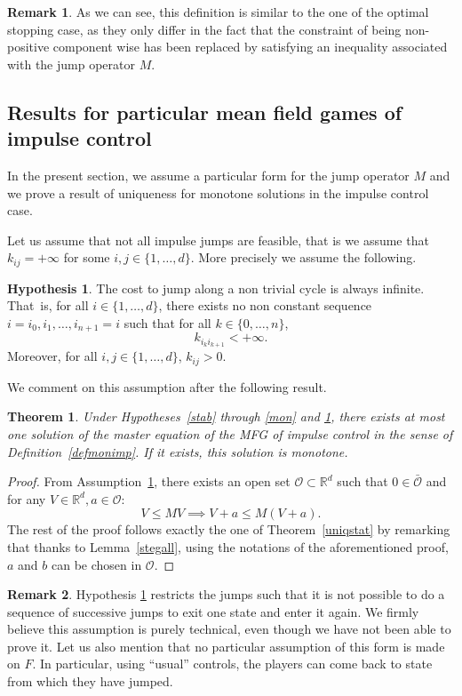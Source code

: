 \documentclass[10pt]{amsart}
\let\mathcal\mathscr
\newtheorem{Theorem}{Theorem}[section]
\theoremstyle{definition}
\newtheorem{Rem}{Remark}[section]
\newtheorem{hyp}{Hypothesis}
\begin{document}
\begin{Rem}
As we can see, this definition is similar to the one of the optimal stopping case, as they only differ in the fact that the constraint of being non-positive component wise has been replaced by satisfying an inequality associated with the jump operator $M$.
\end{Rem}
\subsection{Results for particular mean field games of impulse control}
In the present section, we 	assume a particular form for the jump operator $M$ and we prove a result of uniqueness for monotone solutions in the impulse control case.

Let us assume that not all impulse jumps are feasible, that is we assume that $k_{ij} =+\infty$ for some $i,j \in \{1,\dots,d\}$. More precisely we assume the following.
\begin{hyp}\label{clique}
The cost to jump along a non trivial cycle is always infinite. That~is, for all $i \in \{1,\dots,d\}$, there exists no non constant sequence $i = i_0, i_1,\dots,i_{n+1} = i$ such that for all $k \in \{0,\dots,n\}$,\vspace*{-5pt}
\begin{equation*}
k_{i_{k}i_{k+1}} <+\infty.
\end{equation*}
Moreover, for all $i,j \in \{1,\dots,d\}$, $k_{ij} > 0$.
\end{hyp}
We comment on this assumption after the following result.
\begin{Theorem}
Under Hypotheses~\ref{stab} through \ref{mon} and \ref{clique}, there exists at most one solution of the master equation of the MFG of impulse control in the sense of Definition~\ref{defmonimp}. If it exists, this solution is monotone.
\end{Theorem}
\begin{proof}
From Assumption~\ref{clique}, there exists an open set $\mathcal{O} \subset \mathbb{R}^d$ such that $0 \in \bar{\mathcal{O}}$ and for any $V \in \mathbb{R}^d, a \in \mathcal{O}$:\vspace*{-5pt}\enlargethispage{\baselineskip}%
\begin{equation*}
V \leq MV \implies V+a \leq M(V+a).
\end{equation*}
The rest of the proof follows exactly the one of Theorem~\ref{uniqstat} by remarking that thanks to Lemma~\ref{stegall}, using the notations of the aforementioned proof, $a$ and $b$ can be chosen in $\mathcal{O}$.
\end{proof}
\begin{Rem}
Hypothesis \ref{clique} restricts the jumps such that it is not possible to do a sequence of successive jumps to exit one state and enter it again. We firmly believe this assumption is purely technical, even though we have not been able to prove it. Let us also mention that no particular assumption of this form is made on $F$. In particular, using ``usual'' controls, the players can come back to state from which they have jumped.
\end{Rem}
\end{document}

